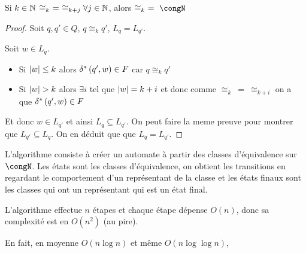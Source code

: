 \begin{prop}
	Si $k \in \mathbb{N}$ \tq $ \cong_k \ = \ \cong_{k+j} \forall j \in \mathbb{N}$, alors $\cong_k \ = \ \congN$
\end{prop}

\begin{proof}
	Soit $q,q' \in Q$, $q \cong_k q'$, \mq $L_q = L_{q'}$.

	Soit $w \in L_q$.
	\begin{itemize}
		\item Si $\left|w\right| \leq k$ alors $\delta^{*} \left(q',w\right) \in F$ car $q \cong_k q'$
		\item Si $\left|w\right| > k$ alors $\exists i $ tel que $\left|w\right| = k + i$ et donc comme $\cong_k \ = \ \cong_{k+i}$ on a que
		      $\delta^{*} \left(q',w\right) \in F$
	\end{itemize}

	Et donc $w \in L_{q'}$ et ainsi $L_q \subseteq L_{q'}$. On peut faire la meme preuve pour montrer que $L_{q'} \subseteq L_q$.
	On en déduit que que $L_q = L_{q'}$.
\end{proof}

\begin{definition}
	L'algorithme consiste à créer un automate à partir des classes d'équivalence sur $\congN$.
	Les états sont les classes d'équivalence, on obtient les transitions en regardant le comportement
	d'un représentant de la classe et les états finaux sont les classes qui ont un représentant qui est un état final.
\end{definition}


\begin{complexite}
	L'algorithme effectue $n$ étapes et chaque étape dépense $O(n)$, donc sa complexité est en $O(n^2)$ (au pire).

	En fait, en moyenne $O(n \log n)$ et même $O(n \log \log n)$,  \cite{David2010TheAC}
\end{complexite}


